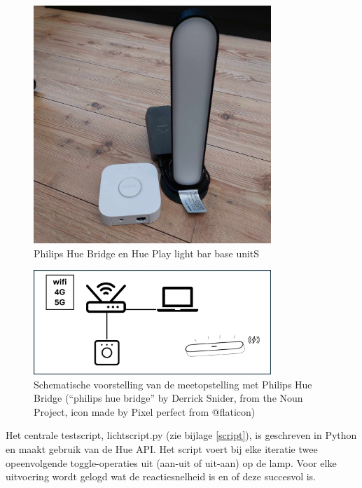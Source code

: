 \begin{figure}   
    \includegraphics[width=0.8\textwidth]{../graphics/philips_hue.jpg}
    \caption[Philips Hue Bridge en Hue Play light bar base unit]{\label{fig:philips}Philips Hue Bridge en Hue Play light bar base unitS}
\end{figure}
\begin{figure}
    
    \includegraphics[width=0.8\textwidth]{../graphics/Opstelling_2.jpg}
    \caption[Schematische voorstelling van de meetopstelling met Philips Hue Bridge (“philips hue bridge” by Derrick Snider, from the Noun Project, icon made by Pixel perfect from @flaticon)]{\label{fig:opstellingphilips}Schematische voorstelling van de meetopstelling met Philips Hue Bridge (“philips hue bridge” by Derrick Snider, from the Noun Project, icon made by Pixel perfect from @flaticon)}
\end{figure}
Het centrale testscript, lichtscript.py (zie bijlage \ref{script}), is geschreven in Python en maakt gebruik van de Hue API. Het script voert bij elke iteratie twee opeenvolgende toggle-operaties uit (aan-uit of uit-aan) op de lamp. Voor elke uitvoering wordt gelogd wat de reactiesnelheid is en of deze succesvol is.

